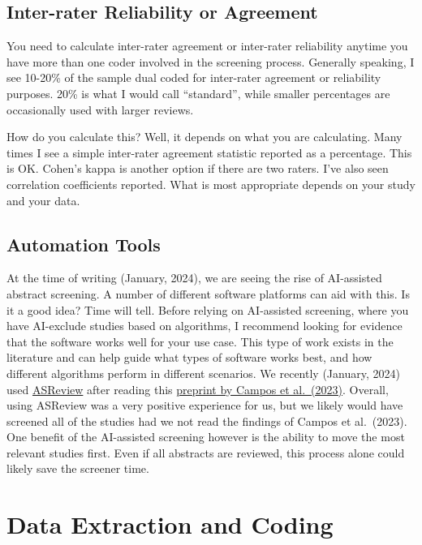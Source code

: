 \documentclass[
]{book}
\begin{document}
\hypertarget{inter-rater-reliability-or-agreement}{%
\section{Inter-rater Reliability or Agreement}\label{inter-rater-reliability-or-agreement}}

You need to calculate inter-rater agreement or inter-rater reliability anytime you have more than one coder involved in the screening process. Generally speaking, I see 10-20\% of the sample dual coded for inter-rater agreement or reliability purposes. 20\% is what I would call ``standard'', while smaller percentages are occasionally used with larger reviews.

How do you calculate this? Well, it depends on what you are calculating. Many times I see a simple inter-rater agreement statistic reported as a percentage. This is OK. Cohen's kappa is another option if there are two raters. I've also seen correlation coefficients reported. What is most appropriate depends on your study and your data.

\hypertarget{automation-tools}{%
\section{Automation Tools}\label{automation-tools}}

At the time of writing (January, 2024), we are seeing the rise of AI-assisted abstract screening. A number of different software platforms can aid with this. Is it a good idea? Time will tell. Before relying on AI-assisted screening, where you have AI-exclude studies based on algorithms, I recommend looking for evidence that the software works well for your use case. This type of work exists in the literature and can help guide what types of software works best, and how different algorithms perform in different scenarios. We recently (January, 2024) used \href{https://asreview.nl/}{ASReview} after reading this \href{https://osf.io/preprints/psyarxiv/fpwc2/download}{preprint by Campos et al.~(2023)}\citep{campos2023}. Overall, using ASReview was a very positive experience for us, but we likely would have screened all of the studies had we not read the findings of Campos et al.~(2023)\citep{campos2023}. One benefit of the AI-assisted screening however is the ability to move the most relevant studies first. Even if all abstracts are reviewed, this process alone could likely save the screener time.

\hypertarget{data}{%
\chapter{Data Extraction and Coding}\label{data}}
\end{document}
